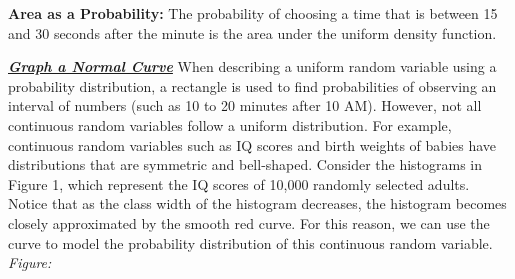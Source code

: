 \documentclass{report}
\begin{document}
    \pagebreak \bigbreak \noindent 
    \textbf{Area as a Probability:}
    \bigbreak \noindent 
    The probability of choosing a time that is between 15 and 30 seconds after the minute is the area under the uniform density function.
    \bigbreak \noindent 

    \bigbreak \noindent \bigbreak \noindent 
    \textbf{\textit{\underline{Graph a Normal Curve}}}
    \bigbreak \noindent 
    When describing a uniform random variable using a probability distribution, a rectangle is used to find probabilities of observing an interval of numbers (such as 10 to 20 minutes after 10 AM). However, not all continuous random variables follow a uniform distribution. For example, continuous random variables such as IQ scores and birth weights of babies have distributions that are symmetric and bell-shaped. Consider the histograms in Figure 1, which represent the IQ scores of 10,000 randomly selected adults. Notice that as the class width of the histogram decreases, the histogram becomes closely approximated by the smooth red curve. For this reason, we can use the curve to model the probability distribution of this continuous random variable.
    \bigbreak \noindent 
    \textit{Figure:}
\end{document}
